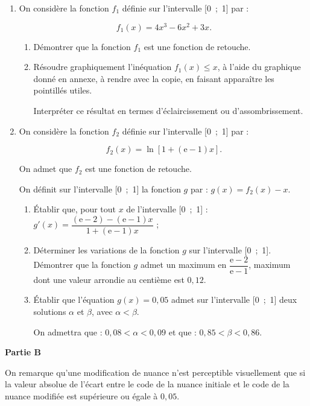 \documentclass[10pt]{article}
\begin{document}
\begin{enumerate}
\item On considère la fonction $f_{1}$ définie sur l'intervalle [0~;~1] par : 

\[f_{1}(x) = 4x^3 - 6x^2 + 3x.\]
 
	\begin{enumerate}
		\item Démontrer que la fonction $f_{1}$ est une fonction de retouche. 
		\item Résoudre graphiquement l'inéquation $f_{1}(x) \leqslant x$, à l'aide du graphique donné en annexe, à rendre avec la copie, en faisant apparaître les pointillés utiles. 

Interpréter ce résultat en termes d'éclaircissement ou d'assombrissement.
	\end{enumerate} 
\item On considère la fonction $f_{2}$ définie sur l'intervalle [0~;~1] par : 

\[f_{2}(x) = \ln [1 + (\text{e} - 1)x].\]
 
On admet que $f_{2}$ est une fonction de retouche. 

On définit sur l'intervalle [0~;~1] la fonction $g$ par : $g(x) = f_{2}(x) - x$. 
		
	\begin{enumerate}
		\item Établir que, pour tout $x$ de l'intervalle [0~;~1] : $g'(x) = \dfrac{(\text{e} - 2) - (\text{e} - 1)x}{1 + (\text{e} - 1)x}$ ;  
		\item Déterminer les variations de la fonction $g$ sur l'intervalle [0~;~1]. 
Démontrer que la fonction $g$ admet un maximum en $\dfrac{\text{e} - 2}{\text{e} - 1}$, maximum dont une valeur arrondie au centième est $0,12$. 
		\item Établir que l'équation $g(x) = 0,05$ admet sur l'intervalle [0~;~1] deux solutions $\alpha$ et $\beta$, 
avec $\alpha < \beta$.
 
On admettra que : $0,08 < \alpha < 0,09$ et que : $0,85 < \beta < 0,86$.
	\end{enumerate} 
\end{enumerate}

\bigskip
 
\textbf{Partie B}

\medskip
 
On remarque qu'une modification de nuance n'est perceptible visuellement que si la valeur absolue de l'écart entre le code de la nuance initiale et le code de la nuance modifiée est supérieure ou égale 
à $0,05$.
\end{document}
